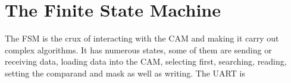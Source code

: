 \section{The Finite State Machine}
The FSM is the crux of interacting with the CAM and making it carry out complex algorithms. 
It has numerous states, some of them are sending or receiving data, loading data into the CAM, selecting first, searching, reading, setting the comparand and mask as well as writing. 
The UART is